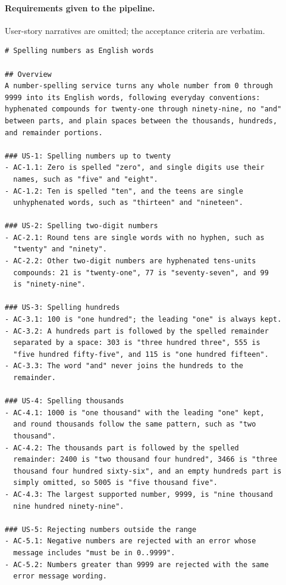 \documentclass{article}
\begin{document}
\paragraph{Requirements given to the pipeline.} User-story narratives are omitted; the acceptance
criteria are verbatim.
\begin{small}
\begin{verbatim}
# Spelling numbers as English words

## Overview
A number-spelling service turns any whole number from 0 through
9999 into its English words, following everyday conventions:
hyphenated compounds for twenty-one through ninety-nine, no "and"
between parts, and plain spaces between the thousands, hundreds,
and remainder portions.

### US-1: Spelling numbers up to twenty
- AC-1.1: Zero is spelled "zero", and single digits use their
  names, such as "five" and "eight".
- AC-1.2: Ten is spelled "ten", and the teens are single
  unhyphenated words, such as "thirteen" and "nineteen".

### US-2: Spelling two-digit numbers
- AC-2.1: Round tens are single words with no hyphen, such as
  "twenty" and "ninety".
- AC-2.2: Other two-digit numbers are hyphenated tens-units
  compounds: 21 is "twenty-one", 77 is "seventy-seven", and 99
  is "ninety-nine".

### US-3: Spelling hundreds
- AC-3.1: 100 is "one hundred"; the leading "one" is always kept.
- AC-3.2: A hundreds part is followed by the spelled remainder
  separated by a space: 303 is "three hundred three", 555 is
  "five hundred fifty-five", and 115 is "one hundred fifteen".
- AC-3.3: The word "and" never joins the hundreds to the
  remainder.

### US-4: Spelling thousands
- AC-4.1: 1000 is "one thousand" with the leading "one" kept,
  and round thousands follow the same pattern, such as "two
  thousand".
- AC-4.2: The thousands part is followed by the spelled
  remainder: 2400 is "two thousand four hundred", 3466 is "three
  thousand four hundred sixty-six", and an empty hundreds part is
  simply omitted, so 5005 is "five thousand five".
- AC-4.3: The largest supported number, 9999, is "nine thousand
  nine hundred ninety-nine".

### US-5: Rejecting numbers outside the range
- AC-5.1: Negative numbers are rejected with an error whose
  message includes "must be in 0..9999".
- AC-5.2: Numbers greater than 9999 are rejected with the same
  error message wording.
\end{verbatim}
\end{small}
\end{document}
